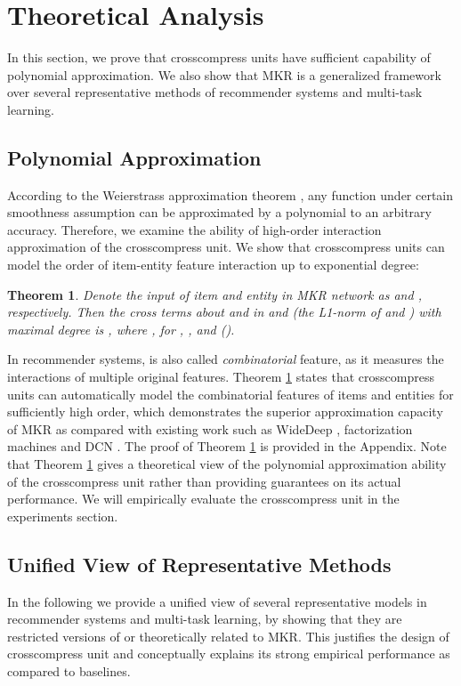 \documentclass[sigconf]{acmart}
\newtheorem{theorem}{Theorem}
\begin{document}
\section{Theoretical Analysis}
	In this section, we prove that crosscompress units have sufficient capability of polynomial approximation.
	We also show that MKR is a generalized framework over several representative methods of recommender systems and multi-task learning.
	
	\subsection{Polynomial Approximation}
		According to the Weierstrass approximation theorem \cite{rudin1964principles}, any function under certain smoothness assumption can be approximated by a polynomial to an arbitrary accuracy.
		Therefore, we examine the ability of high-order interaction approximation of the crosscompress unit. 
		We show that crosscompress units can model the order of item-entity feature interaction up to exponential degree:
		
		\begin{theorem}
		\label{thm:1}
			Denote the input of item and entity in MKR network as  and , respectively.
			Then the cross terms about  and  in  and  (the L1-norm of  and ) with maximal degree is , where ,  for , , and  ().
		\end{theorem}
		
		In recommender systems,  is also called \textit{combinatorial} feature, as it measures the interactions of multiple original features.
		Theorem \ref{thm:1} states that crosscompress units can automatically model the combinatorial features of items and entities for sufficiently high order, which demonstrates the superior approximation capacity of MKR as compared with existing work such as WideDeep \cite{cheng2016wide}, factorization machines \cite{rendle2010factorization, rendle2012factorization} and DCN \cite{wang2017deep}.
		The proof of Theorem \ref{thm:1} is provided in the Appendix.
		Note that Theorem \ref{thm:1} gives a theoretical view of the polynomial approximation ability of the crosscompress unit rather than providing guarantees on its actual performance.
		We will empirically evaluate the crosscompress unit in the experiments section.
		
	
	\subsection{Unified View of Representative Methods}
	\label{sec:unified_view}
		In the following we provide a unified view of several representative models in recommender systems and multi-task learning, by showing that they are restricted versions of or theoretically related to MKR.
		This justifies the design of crosscompress unit and conceptually explains its strong empirical performance as compared to baselines.
		
\end{document}
